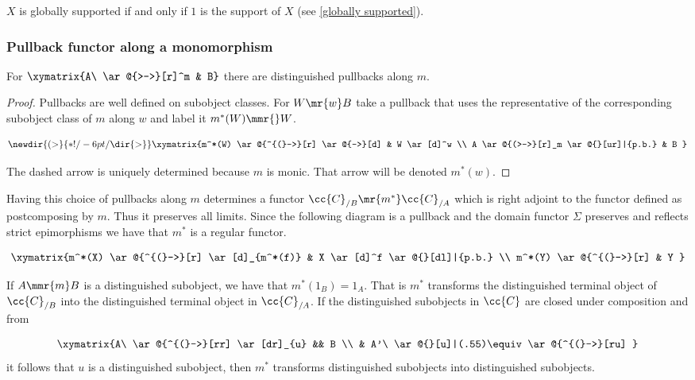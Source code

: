\begin{observation}
$X$ is globally supported if and only if $1$ is the support of $X$ (see \ref{globally supported}). 
\end{observation}

\subsubsection{Pullback functor along a monomorphism}

\begin{proposition}
For $\xymatrix{A\ \ar@{>->}[r]^m & B}$ there are distinguished pullbacks along $m$.
\end{proposition}

\begin{proof}
Pullbacks are well defined on subobject classes. For  $W \mr{w} B$ take a pullback that uses the representative of the corresponding subobject class of $m$ along $w$ and label it $m^*(W) \mmr{} W$.

\[
\newdir{(>}{{}*!/-6pt/\dir{>}}
\xymatrix{m^*(W) \ar@{^{(}->}[r] \ar@{-->}[d] & W \ar[d]^w \\
		   A \ar@{(>->}[r]_m \ar@{}[ur]|{p.b.}  &  B  }
\]

The dashed arrow is uniquely determined because $m$ is monic. That arrow will be denoted $m^*(w)$. 
\end{proof}

\begin{remark}\label{adjuncion pullback}
Having this choice of pullbacks along $m$ determines a functor $ \cc{C}_{/B} \mr{m^*}\cc{C}_{/A}$ which is right adjoint to the functor defined as postcomposing by $m$. Thus it preserves all limits. 
Since the following diagram is a pullback and the domain functor $\Sigma$ preserves and reflects strict epimorphisms we have that $m^*$ is a regular functor.


\begin{align*}
\xymatrix{m^*(X) \ar@{^{(}->}[r] \ar[d]_{m^*(f)} & X \ar[d]^f \ar@{}[dl]|{p.b.} \\
		  m^*(Y) \ar@{^{(}->}[r] & Y }
\end{align*}

\end{remark}

\begin{observation}
If $A \mmr{m} B$ is a distinguished subobject, we have that $m^*(1_B)=1_A$. That is $m^*$ transforms the distinguished terminal object of $\cc{C}_{/B}$ into the distinguished terminal object in $\cc{C}_{/A}$. If the distinguished subobjects in $\cc{C}$ are closed under composition and from
 
 \[
 \xymatrix{A\ \ar@{^{(}->}[rr] \ar[dr]_{u} && B
 \\
 		                &  A'\ \ar@{}[u]|(.55)\equiv \ar@{^{(}->}[ru] 
 		  }
 \]
 it follows that $u$ is a distinguished subobject, then  $m^*$ transforms distinguished subobjects into distinguished subobjects.
\end{observation}

